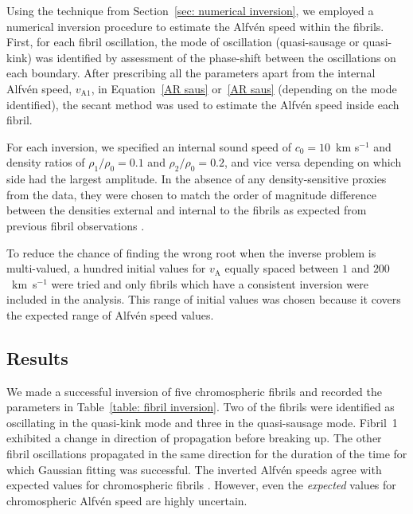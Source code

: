Using the technique from Section~\ref{sec: numerical inversion}, we employed a numerical inversion procedure to estimate the Alfv\'{e}n speed within the fibrils. First, for each fibril oscillation, the mode of oscillation (quasi-sausage or quasi-kink) was identified by assessment of the phase-shift between the oscillations on each boundary. After prescribing all the parameters apart from the internal Alfv\'{e}n speed, $v_\mathrm{A1}$, in Equation~\eqref{AR saus} or~\eqref{AR saus} (depending on the mode identified), the secant method was used to estimate the Alfv\'{e}n speed inside each fibril.

For each inversion, we specified an internal sound speed of $c_0 = 10$~km s$^{-1}$ and density ratios of $\rho_1/\rho_0 = 0.1$ and $\rho_2/\rho_0 = 0.2$, and vice versa depending on which side had the largest amplitude. In the absence of any density-sensitive proxies from the data, they were chosen to match the order of magnitude difference between the densities external and internal to the fibrils as expected from previous fibril observations \citep{lee_etal12,mor_etal12}.

To reduce the chance of finding the wrong root when the inverse problem is multi-valued, a hundred initial values for $v_\mathrm{A}$ equally spaced between $1$ and $200$~km~s$^{-1}$ were tried and only fibrils which have a consistent inversion were included in the analysis. This range of initial values was chosen because it covers the expected range of Alfv\'{e}n speed values.


\subsection{Results}\label{sec:sms results}
We made a successful inversion of five chromospheric fibrils and recorded the parameters in Table~\ref{table: fibril inversion}. Two of the fibrils were identified as oscillating in the quasi-kink mode and three in the quasi-sausage mode. Fibril~1 exhibited a change in direction of propagation before breaking up. The other fibril oscillations propagated in the same direction for the duration of the time for which Gaussian fitting was successful. The inverted Alfv\'{e}n speeds agree with expected values for chromospheric fibrils \citep{mor_etal12}. However, even the \textit{expected} values for chromospheric Alfv\'{e}n speed are highly uncertain.

